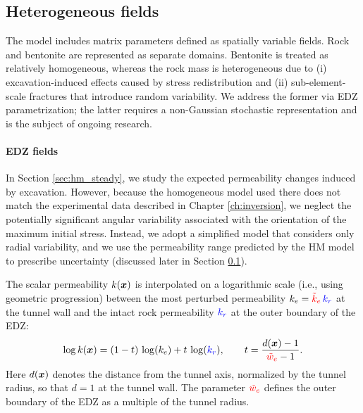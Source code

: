 \subsection{Heterogeneous fields}
\label{sec:parameters}

The model includes matrix parameters defined as spatially variable fields. Rock
and bentonite are represented as separate domains. Bentonite is treated as
relatively homogeneous, whereas the rock mass is heterogeneous due to
(i) excavation-induced effects caused by stress redistribution and
(ii) sub-element-scale fractures that introduce random variability. We address
the former via \gls{EDZ} parametrization; the latter requires a non-Gaussian
stochastic representation and is the subject of ongoing research.

\def\edzRelThick{{\color{red}\tilde{w}_e}}
\def\edzPerm{{\color{red}\tilde{k}_e}}
\def\iPerm{{\color{blue}k_r}}
\def\edzPor{{\color{red}\tilde{\theta}_e}}
\def\iPor{{\color{blue}\theta_r}}

\paragraph{EDZ fields}

In Section \ref{sec:hm_steady}, we study the expected permeability changes
induced by excavation. However, because the homogeneous model used there does
not match the experimental data described in Chapter \ref{ch:inversion}, we
neglect the potentially significant angular variability associated with the
orientation of the maximum initial stress. Instead, we adopt a simplified model
that considers only radial variability, and we use the permeability range
predicted by the HM model to prescribe uncertainty (discussed later in
Section \ref{sec:parameters}).

The scalar permeability $k({\bm{x}})$ is interpolated on a logarithmic scale
(i.e., using geometric progression) between the most perturbed permeability
$k_e=\edzPerm\,\iPerm$ at the tunnel wall and the intact rock permeability
$\iPerm$ at the outer boundary of the EDZ:
\begin{equation}
    \label{eq:edz_perm}
    \log k(\vc x) = (1-t)\,\log(k_e) + t\,\log(\iPerm),
    \qquad
    t=\frac{d(\vc x)-1}{\edzRelThick-1}.
\end{equation}
Here $d({\bm{x}})$ denotes the distance from the tunnel axis, normalized by the
tunnel radius, so that $d=1$ at the tunnel wall. The parameter $\edzRelThick$
defines the outer boundary of the EDZ as a multiple of the tunnel radius.

